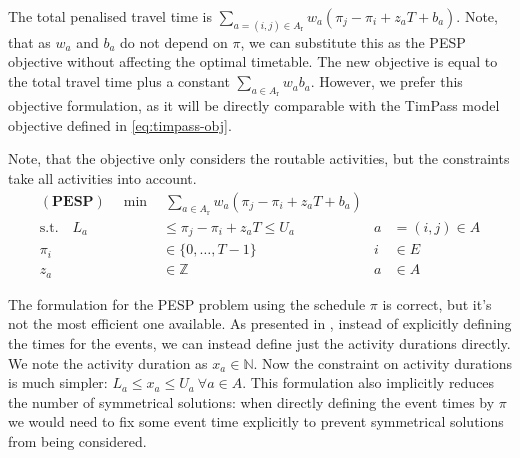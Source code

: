 \documentclass[english, 12pt, a4paper, sci, utf8, a-2b, online]{aaltothesis}
\newcommand{\N}{\mathbb{N}}
\newcommand{\Z}{\mathbb{Z}}
\newcommand{\Ar}{A_\text{r}}
\begin{document}
The total penalised travel time is $\sum_{a=(i,j) \in \Ar} w_a (\pi_j - \pi_i + z_aT + b_a)$. Note, that as $w_a$ and $b_a$ do not depend on $\pi$, we can substitute this as the PESP objective without affecting the optimal timetable. The new objective is equal to the total travel time plus a constant $\sum_{a \in \Ar}w_ab_a$. However, we prefer this objective formulation, as it will be directly comparable with the TimPass model objective defined in \cref{eq:timpass-obj}.


Note, that the objective only considers the routable activities, but the constraints take all activities into account.
\begin{align}
    \mathbf{(PESP)}\quad\min&\ \sum_{a \in \Ar} w_{a} (\pi_j-\pi_i+z_aT + b_a) \\
    \textrm{s.t.} \quad L_a &\leq \pi_j-\pi_i+z_aT  \leq U_a  &a &=(i,j)\in A \\
    \pi_i &\in \{0, \dots, T-1\} &i &\in E\\
    z_a &\in \Z &a &\in A
\end{align}



The formulation for the PESP problem using the schedule $\pi$ is correct, but it's not the most efficient one available. As presented in \cite{cycle-basis-original-2001}, instead of explicitly defining the times for the events, we can instead define just the activity durations directly. We note the activity duration as $x_a \in \N$. Now the constraint on activity durations is much simpler: $L_a \leq x_a \leq U_a\ \forall a \in A$. This formulation also implicitly reduces the number of symmetrical solutions: when directly defining the event times by $\pi$ we would need to fix some event time explicitly to prevent symmetrical solutions from being considered.
\end{document}
